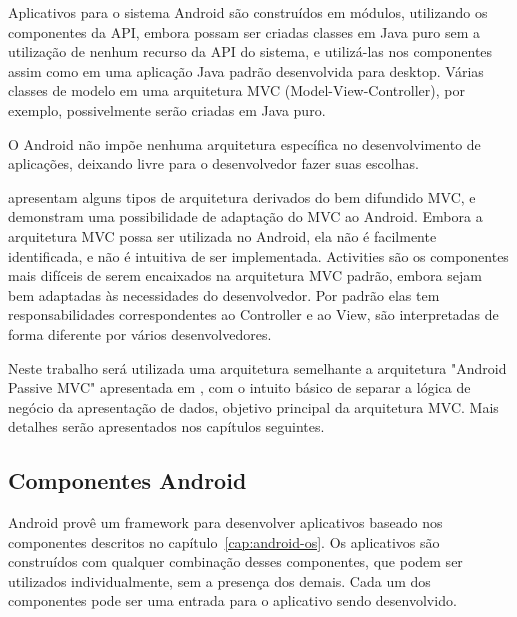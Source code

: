 Aplicativos para o sistema Android são construídos em módulos, utilizando os componentes da API, embora possam ser criadas classes em Java puro sem a utilização de nenhum recurso da API do sistema, e utilizá-las nos componentes assim como em uma aplicação Java padrão desenvolvida para desktop. Várias classes de modelo em uma arquitetura MVC (Model-View-Controller), por exemplo, possivelmente serão criadas em Java puro.

O Android não impõe nenhuma arquitetura específica no desenvolvimento de aplicações, deixando livre para o desenvolvedor fazer suas escolhas.

 apresentam alguns tipos de arquitetura derivados do bem difundido MVC, e demonstram uma possibilidade de adaptação do MVC ao Android. Embora a arquitetura MVC possa ser utilizada no Android, ela não é facilmente identificada, e não é intuitiva de ser implementada. Activities são os componentes mais difíceis de serem encaixados na arquitetura MVC padrão, embora sejam bem adaptadas às necessidades do desenvolvedor. Por padrão elas tem responsabilidades correspondentes ao Controller e ao View, são interpretadas de forma diferente por vários desenvolvedores.

Neste trabalho será utilizada uma arquitetura semelhante a arquitetura "Android Passive MVC" apresentada em , com o intuito básico de separar a lógica de negócio da apresentação de dados, objetivo principal da arquitetura MVC. Mais detalhes serão apresentados nos capítulos seguintes.

\subsection{Componentes Android}

Android provê um framework para desenvolver aplicativos baseado nos componentes descritos no capítulo~\ref{cap:android-os}. Os aplicativos são construídos com qualquer combinação desses componentes, que podem ser utilizados individualmente, sem a presença dos demais. Cada um dos componentes pode ser uma entrada para o aplicativo sendo desenvolvido.

